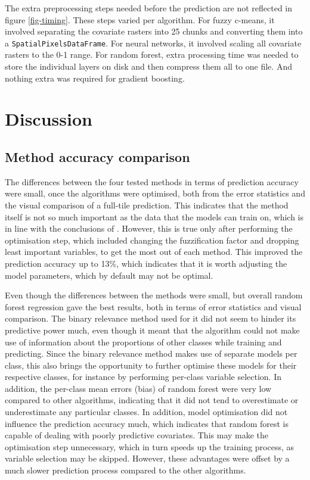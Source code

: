 \documentclass[a4paper,10pt]{book}
\begin{document}
The extra preprocessing steps needed before the prediction are not reflected in figure \ref{fig-timing}. These steps varied per algorithm. For fuzzy c-means, it involved separating the covariate rasters into 25 chunks and converting them into a \texttt{SpatialPixelsDataFrame}. For neural networks, it involved scaling all covariate rasters to the 0-1 range. For random forest, extra processing time was needed to store the individual layers on disk and then compress them all to one file. And nothing extra was required for gradient boosting.

\chapter{Discussion}

\section{Method accuracy comparison}

The differences between the four tested methods in terms of prediction accuracy were small, once the algorithms were optimised, both from the error statistics and the visual comparison of a full-tile prediction. This indicates that the method itself is not so much important as the data that the models can train on, which is in line with the conclusions of \citet{yu2014metadiscoveries}. However, this is true only after performing the optimisation step, which included changing the fuzzification factor and dropping least important variables, to get the most out of each method. This improved the prediction accuracy up to 13\%, which indicates that it is worth adjusting the model parameters, which by default may not be optimal.

Even though the differences between the methods were small, but overall random forest regression gave the best results, both in terms of error statistics and visual comparison. The binary relevance method used for it did not seem to hinder its predictive power much, even though it meant that the algorithm could not make use of information about the proportions of other classes while training and predicting. Since the binary relevance method makes use of separate models per class, this also brings the opportunity to further optimise these models for their respective classes, for instance by performing per-class variable selection. In addition, the per-class mean errors (bias) of random forest were very low compared to other algorithms, indicating that it did not tend to overestimate or underestimate any particular classes. In addition, model optimisation did not influence the prediction accuracy much, which indicates that random forest is capable of dealing with poorly predictive covariates. This may make the optimisation step unnecessary, which in turn speeds up the training process, as variable selection may be skipped. However, these advantages were offset by a much slower prediction process compared to the other algorithms.
\end{document}
